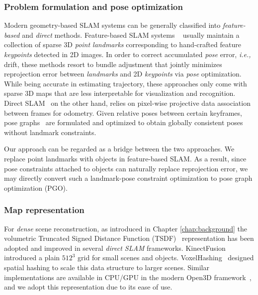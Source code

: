 \subsubsection{Problem formulation and pose optimization}
Modern geometry-based SLAM systems can be generally classified into \textit{feature-based} and \textit{direct} methods.
%
Feature-based SLAM systems ~\cite{mur-artalORBSLAM2OpenSourceSLAM2017, kleinParallelTrackingMapping2007} usually maintain a collection of sparse 3D \textit{point landmarks} corresponding to hand-crafted feature \textit{keypoints} detected in 2D images. In order to correct accumulated \textit{pose} error, \textit{i.e.,} drift, these methods resort to bundle adjustment \cite{triggsBundleAdjustmentModern2000} that jointly minimizes reprojection error between \textit{landmarks} and 2D \textit{keypoints} via \textit{pose} optimization. While being accurate in estimating trajectory, these approaches only come with sparse 3D maps that are less interpretable for visualization and recognition.
%
Direct SLAM~\cite{engelLSDSLAMLargeScaleDirect, engelDirectSparseOdometry2018} on the other hand, relies on pixel-wise projective data association between frames for odometry. Given relative poses between certain keyframes, pose graphs~\cite{dellaertFactorGraphsRobot2017} are formulated and optimized to obtain globally consistent poses without landmark constraints.

Our approach can be regarded as a bridge between the two approaches. We replace point landmarks with objects in feature-based SLAM. As a result, since pose constraints attached to objects can naturally replace reprojection error, we may directly convert such a landmark-pose constraint optimization to pose graph optimization (PGO).

\subsubsection{Map representation}
For \textit{dense} scene reconstruction, as introduced in Chapter \ref{chap:background} the volumetric Truncated Signed Distance Function (TSDF)~\cite{curlessVolumetricMethodBuilding1996} representation has been adopted and improved in several \textit{direct SLAM} frameworks. KinectFusion~\cite{newcombeKinectFusionRealtimeDense2011} introduced a plain $512^3$ grid for small scenes and objects. VoxelHashing~\cite{niessnerRealtime3DReconstruction2013} designed spatial hashing to scale this data structure to larger scenes. Similar implementations are available in CPU/GPU in the modern Open3D framework~\cite{zhouOpen3DModernLibrary2018, dongGPUAcceleratedRobust2019}, and we adopt this representation due to its ease of use.

